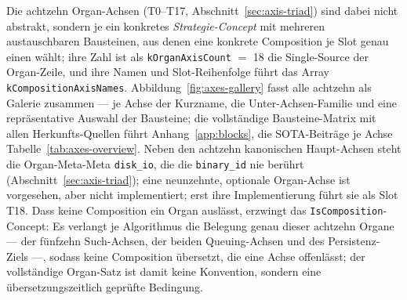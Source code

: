 \begin{nurlang}
Die achtzehn Organ-Achsen (T0--T17, Abschnitt~\ref{sec:axis-triad}) sind dabei nicht abstrakt, sondern je
ein konkretes \emph{Strategie-Concept} mit mehreren austauschbaren Bausteinen, aus denen eine konkrete
Composition je Slot genau einen wählt; ihre Zahl ist als \texttt{kOrganAxisCount} $=$ 18 die Single-Source
der Organ-Zeile, und ihre Namen und Slot-Reihenfolge führt das Array \texttt{kCompositionAxisNames}.
Abbildung~\ref{fig:axes-gallery} fasst alle achtzehn als Galerie zusammen --- je Achse der Kurzname, die
Unter-Achsen-Familie und eine repräsentative Auswahl der Bausteine; die vollständige Bausteine-Matrix mit
allen Herkunfts-Quellen führt Anhang~\ref{app:blocks}, die SOTA-Beiträge je Achse Tabelle~\ref{tab:axes-overview}.
Neben den achtzehn kanonischen Haupt-Achsen steht die Organ-Meta-Meta \texttt{disk\_io}, die die
\texttt{binary\_id} nie berührt (Abschnitt~\ref{sec:axis-triad}); eine neunzehnte, optionale Organ-Achse
ist vorgesehen, aber nicht implementiert; erst ihre Implementierung führt sie als Slot T18.
Dass keine Composition ein Organ auslässt, erzwingt das \texttt{IsComposition}-Concept: Es verlangt je
Algorithmus die Belegung genau dieser achtzehn Organe --- der fünfzehn Such-Achsen, der beiden
Queuing-Achsen und des Persistenz-Ziels ---, sodass keine Composition übersetzt, die eine Achse offenlässt;
der vollständige
Organ-Satz ist damit keine Konvention, sondern eine übersetzungszeitlich geprüfte Bedingung.
\begin{figure}[htbp]\centering
\end{figure}
\end{nurlang}
